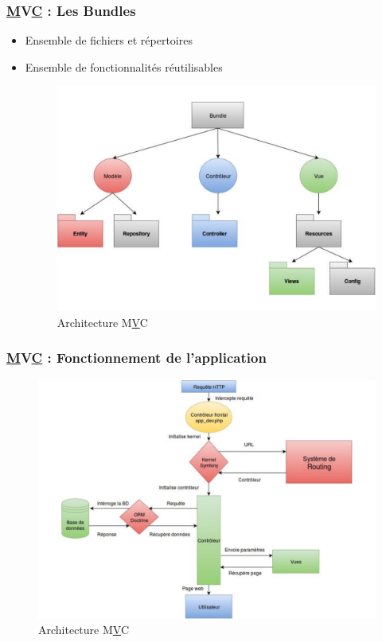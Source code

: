 \speaker{\Florian}

\begin{frame}
  \frametitle{\underline{M}V\underline{C} : Les Bundles}
  \begin{itemize}
    \item Ensemble de fichiers et répertoires
    \item Ensemble de fonctionnalités réutilisables
\begin{figure}[!h]
	\begin{center}
	\includegraphics[scale=0.3]{images/bundles}
	\caption{Architecture M\underline{V}C}
	\end{center}
\end{figure}
  \end{itemize}
\end{frame}


\begin{frame}
  \frametitle{\underline{M}V\underline{C} : Fonctionnement de l'application}
        \begin{figure}[!h]
	\begin{center}
	\includegraphics[scale=0.3]{images/symfony}
	\caption{Architecture M\underline{V}C}
	\end{center}
\end{figure}
\end{frame}

